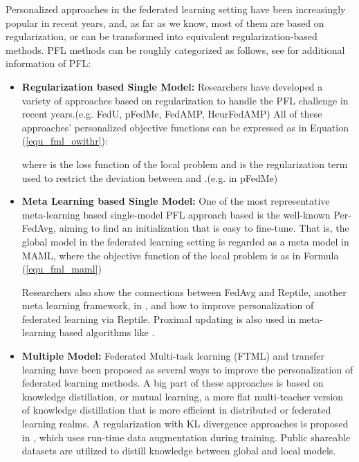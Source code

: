 \documentclass{article}
\begin{document}
Personalized approaches in the federated learning setting have been increasingly popular in recent years, and, as far as we know, most of them are based on regularization, or can be transformed into equivalent regularization-based methods. PFL methods can be roughly categorized as follows, see \cite{tan2022towards} for additional information of PFL:
\begin{itemize}
    \item \textbf{Regularization based Single Model:}
        Researchers have developed a variety of approaches based on regularization to handle the PFL challenge in recent years.(e.g. FedU\cite{dinh2021fedu}, pFedMe\cite{t2020personalized}, FedAMP\cite{huang2021personalized}, HeurFedAMP\cite{huang2021personalized})
        All of these approaches' personalized objective functions can be expressed as in Equation (\ref{equ_fml_owithr}):
        
        where  is the loss function of the local problem and  is the regularization term used to restrict the deviation between  and .(e.g.  in pFedMe)
    
    \item \textbf{Meta Learning based Single Model:}
        One of the most representative meta-learning based single-model PFL approach based is the well-known Per-FedAvg\cite{fallah2020personalized}, aiming to find an initialization that is easy to fine-tune. That is, the global model in the federated learning setting is regarded as a meta model in MAML\cite{fallah2020convergence}, where the objective function of the local problem is as in Formula (\ref{equ_fml_maml})
        
        Researchers also show the connections between FedAvg\cite{mcmahan2017communication} and Reptile\cite{nichol2018first}, another meta learning framework, in \cite{jiang2019improving}, and how to improve personalization of federated learning via Reptile. Proximal updating is also used in meta-learning based algorithms like \cite{zhou2019efficient}.
    
    \item \textbf{Multiple Model:}
        Federated Multi-task learning (FTML) and transfer learning have been proposed as several ways to improve the personalization of federated learning methods\cite{smith2017federated, wu2020personalized, li2019fedmd}.
        A big part of these approaches is based on knowledge distillation\cite{hinton2015distilling}, or mutual learning\cite{zhang2018deep}, a more flat multi-teacher version of knowledge distillation that is more efficient in distributed or federated learning realms\cite{anil2018large, jeong2018communication, shen2020federated}.
        A regularization with KL divergence approaches is proposed in \cite{yang2021h}, which uses run-time data augmentation during training. Public shareable datasets are utilized to distill knowledge between global and local models\cite{li2019fedmd}.
    

\end{itemize}
\end{document}
